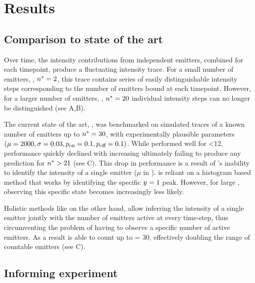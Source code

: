 \section{Results}

\subsection{Comparison to state of the art \lbfcs}

%
Over time, the intensity contributions from independent emitters, combined for each timepoint, produce a fluctuating intensity trace.
	For a small number of emitters, \ie, $n^* = 2$, this trace contains series of easily distinguishable intensity steps corresponding to the number of emitters bound at each timepoint.
  However, for a larger number of emitters, \ie, $n^* = 20$ individual intensity steps can no longer be distinguished (see  A,B).

The current state of the art, \lbfcs, was benchmarked on simulated traces of a known number of emitters up to $n^* = 30$, with experimentally plausible parameters $(\mu=2000, \sigma=0.03, p_\text{on}=0.1, p_\text{off}=0.1)$.
While \lbfcs performed well for \truen \textless 12, performance quickly declined with increasing \truen ultimately failing to produce any prediction for $n^* > 21$ (see  C).
This drop in performance is a result of \lbfcs’s inability to identify the intensity of a single emitter ($\mu$ in \ours). \lbfcs is reliant on a histogram based method that works by identifying the specific $y_{}=1$ peak. However, for large \truen, observing this specific state becomes increasingly less likely. 

Holistic methods like \ours on the other hand, allow inferring the intensity of a single emitter
jointly with the number of emitters active at every time-step, thus
circumventing the problem of having to observe a specific number of active emitters.
As a result \ours is able to count up to \truen = 30, effectively doubling the range of countable emitters (see  C).



\subsection{Informing experiment}

